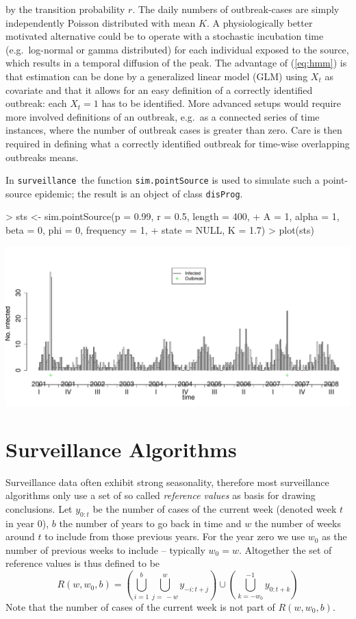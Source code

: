 \documentclass[a4paper,11pt]{article}
\newcommand{\surveillance}{\texttt{surveillance}}
\begin{document}
by the transition probability $r$. The daily numbers of outbreak-cases
are simply independently Poisson distributed with mean $K$. A
physiologically better motivated alternative could be to operate with
a stochastic incubation time (e.g.\ log-normal or gamma distributed)
for each individual exposed to the source, which results in a temporal
diffusion of the peak. The advantage of (\ref{eq:hmm}) is that
estimation can be done by a generalized linear model (GLM) using $X_t$
as covariate and that it allows for an easy definition of a correctly
identified outbreak: each $X_t=1$ has to be identified. More advanced
setups would require more involved definitions of an outbreak, e.g.\ 
as a connected series of time instances, where the number of outbreak
cases is greater than zero.  Care is then required in defining what a
correctly identified outbreak for time-wise overlapping outbreaks means.

In \surveillance\ the function \verb+sim.pointSource+ is used to
simulate such a point-source epidemic; the result is an object of class
\verb+disProg+.

\label{ex:sts}
\begin{Schunk}
\begin{Sinput}
> sts <- sim.pointSource(p = 0.99, r = 0.5, length = 400, 
+     A = 1, alpha = 1, beta = 0, phi = 0, frequency = 1, 
+     state = NULL, K = 1.7)
> plot(sts)
\end{Sinput}
\end{Schunk}
\includegraphics{figs/vignette-003}

\section{Surveillance Algorithms}\label{sec:algo}
Surveillance data often exhibit strong seasonality, therefore most
surveillance algorithms only use a set of so called \emph{reference
  values} as basis for drawing conclusions. Let $y_{0:t}$ be the
number of cases of the current week (denoted week $t$ in year $0$), $b$
the number of years to go back in time and $w$ the number of weeks
around $t$ to include from those previous years. For the year zero we
use $w_0$ as the number of previous weeks to include -- typically
$w_0=w$. Altogether the set of reference values is thus defined to be
\[
R(w,w_0,b) =
\left(\bigcup\limits_{i=1}^b\bigcup\limits_{j=\,-w}^w
  y_{-i:t+j}\right)   \cup
\left(\bigcup_{k=-w_0}^{-1} y_{0:t+k}\right)
\]
Note that the number of cases of the current week is not part of
$R(w,w_0,b)$.
\end{document}
